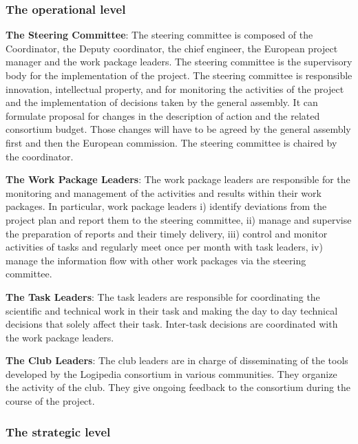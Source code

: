 \subsubsection*{The operational level}

\begin{compactitem}
\item{\bf The Steering Committee}: The steering committee is composed
  of the Coordinator, the Deputy coordinator, the chief engineer, the
  European project manager and the work package leaders. The steering
  committee is the supervisory body for the implementation of the
  project. The steering committee is responsible innovation,
  intellectual property, and for monitoring the activities of the
  project and the implementation of decisions taken by the general
  assembly. It can formulate proposal for changes in the description
  of action and the related consortium budget. Those changes will have
  to be agreed by the general assembly first and then the European
  commission. The steering committee is chaired by the coordinator.

\item{\bf The Work Package Leaders}: The work package leaders are
responsible for the monitoring and management of the activities and
results within their work packages. In particular, work package
leaders i) identify deviations from the project plan and report them
to the steering committee, ii) manage and supervise the preparation of
reports and their timely delivery, iii) control and monitor activities
of tasks and regularly meet once per month with task leaders, iv)
manage the information flow with other work packages via the steering
committee.

\item{\bf The Task Leaders}: The task leaders are responsible for
coordinating the scientific and technical work in their task and
making the day to day technical decisions that solely affect their
task. Inter-task decisions are coordinated with the work package
leaders.

\item{\bf The Club Leaders}: The club leaders are in charge of
disseminating of the tools developed by the Logipedia consortium in
various communities. They organize the activity of the club. They give
ongoing feedback to the consortium during the course of the project.
\end{compactitem}

\subsubsection*{The strategic level}

